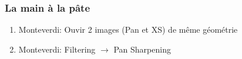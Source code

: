 \documentclass[compress]{beamer}
\begin{document}
\begin{frame}
\begin{columns}
\begin{column}{0.45\textwidth}
\end{column}
\end{columns}

\end{frame}

\begin{frame}
\frametitle{La main à la pâte}
\begin{enumerate}
\item Monteverdi: Ouvir 2 images (Pan et XS) de même géométrie
\item Monteverdi: Filtering $\rightarrow$ Pan Sharpening
\end{enumerate}
\end{frame}
\end{document}
